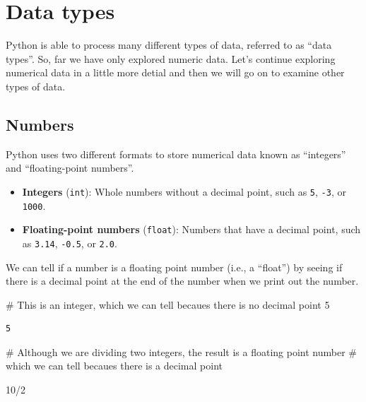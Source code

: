 \documentclass[
  letterpaper,
  DIV=11,
  numbers=noendperiod]{scrreprt}
\newenvironment{Shaded}{\begin{snugshade}}{\end{snugshade}}
\newcommand{\CommentTok}[1]{\textcolor[rgb]{0.37,0.37,0.37}{#1}}
\newcommand{\DecValTok}[1]{\textcolor[rgb]{0.68,0.00,0.00}{#1}}
\newcommand{\OperatorTok}[1]{\textcolor[rgb]{0.37,0.37,0.37}{#1}}
\providecommand{\tightlist}{%
  \setlength{\itemsep}{0pt}\setlength{\parskip}{0pt}}\usepackage{longtable,booktabs,array}
\begin{document}
\section{Data types}\label{data-types}

Python is able to process many different types of data, referred to as
``data types''. So, far we have only explored numeric data. Let's
continue exploring numerical data in a little more detial and then we
will go on to examine other types of data.

\subsection{Numbers}\label{numbers}

Python uses two different formats to store numerical data known as
``integers'' and ``floating-point numbers''.

\begin{itemize}
\tightlist
\item
  \textbf{Integers} (\texttt{int}): Whole numbers without a decimal
  point, such as \texttt{5}, \texttt{-3}, or \texttt{1000}.
\item
  \textbf{Floating-point numbers} (\texttt{float}): Numbers that have a
  decimal point, such as \texttt{3.14}, \texttt{-0.5}, or \texttt{2.0}.
\end{itemize}

We can tell if a number is a floating point number (i.e., a ``float'')
by seeing if there is a decimal point at the end of the number when we
print out the number.

\begin{Shaded}
\begin{Highlighting}[]
\CommentTok{\# This is an integer, which we can tell becaues there is no decimal point}
\DecValTok{5}
\end{Highlighting}
\end{Shaded}

\begin{verbatim}
5
\end{verbatim}

\begin{Shaded}
\begin{Highlighting}[]
\CommentTok{\# Although we are dividing two integers, the result is a floating point number}
\CommentTok{\# which we can tell becaues there is a decimal point}

\DecValTok{10}\OperatorTok{/}\DecValTok{2}
\end{Highlighting}
\end{Shaded}
\end{document}
